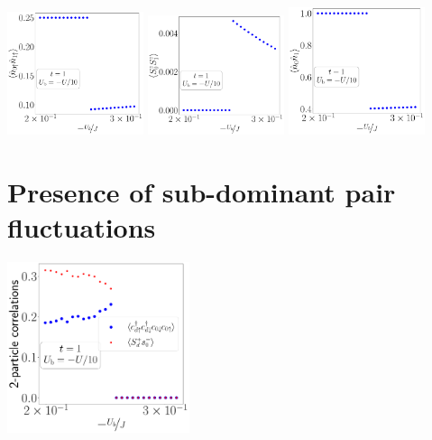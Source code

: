 \begin{center}
	\includegraphics[width=0.3\textwidth]{../figures/r-par-D=1000.00000,t=1.00000,J=30.00000,V=1.50000J,Ub=-Uby10,N=4,U=59.85787,93.55363,25.pdf}
	\includegraphics[width=0.3\textwidth]{../figures/r-ising-D=1000.00000,t=1.00000,J=30.00000,V=1.50000J,Ub=-Uby10,N=4,U=59.85787,93.55363,25.pdf}
	\includegraphics[width=0.3\textwidth]{../figures/r-charge-D=1000.00000,t=1.00000,J=30.00000,V=1.50000J,Ub=-Uby10,N=4,U=59.85787,93.55363,25.pdf}
\end{center}

\section{Presence of sub-dominant pair fluctuations}
\begin{center}
	\includegraphics[width=0.4\textwidth]{../figures/odlro-D=1000.00000,t=1.00000,J=30.00000,V=1.50000J,Ub=-Uby10,N=4,U=59.85787,93.55363,25.pdf}
	\label{pair_fluc}
\end{center}

